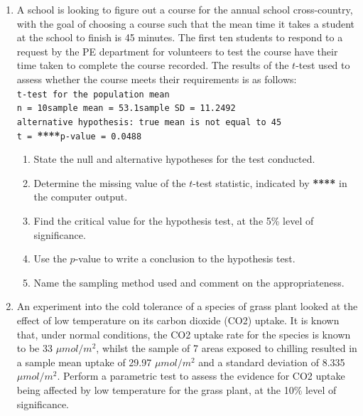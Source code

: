 \documentclass[
  11pt,
]{book}
\begin{document}
\begin{enumerate}[resume]
    \item A school is looking to figure out a course for the annual school cross-country, with the goal of choosing a course such that the mean time it takes a student at the school to finish is 45 minutes. The first ten students to respond to a request by the PE department for volunteers to test the course have their time taken to complete the course recorded. The results of the $t$-test used to assess whether the course meets their requirements is as follows:\vspace{0.5cm}\\
    \texttt{t-test for the population mean}\\
    \texttt{n = 10}\qquad \texttt{sample mean = 53.1}\qquad \texttt{sample SD = 11.2492}\\
    \texttt{alternative hypothesis: true mean is not equal to 45}\\
    \texttt{t = }\textbf{****}\qquad \texttt{p-value = 0.0488}\\
    \vspace{0.1cm}
    \begin{enumerate}
        \item State the null and alternative hypotheses for the test conducted.
        \item Determine the missing value of the $t$-test statistic, indicated by \textbf{****} in the computer output.
        \item Find the critical value for the hypothesis test, at the 5\% level of significance.
        \item Use the $p$-value to write a conclusion to the hypothesis test.
        \item Name the sampling method used and comment on the appropriateness. 
    \end{enumerate}
    \item An experiment into the cold tolerance of a species of grass plant looked at the effect of low temperature on its carbon dioxide (CO2) uptake. It is known that, under normal conditions, the CO2 uptake rate for the species is known to be 33 $\mu mol/m^\text{2}$, whilst the sample of 7 areas exposed to chilling resulted in a sample mean uptake of 29.97 $\mu mol/m^\text{2}$ and a standard deviation of 8.335 $\mu mol/m^\text{2}$. Perform a parametric test to assess the evidence for CO2 uptake being affected by low temperature for the grass plant, at the 10\% level of significance.
\end{enumerate}

\pagebreak
\end{document}
